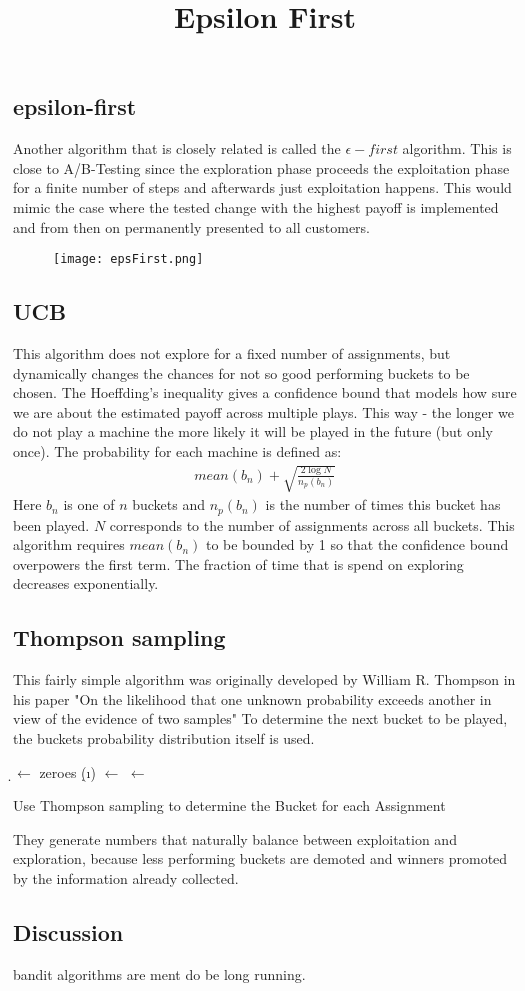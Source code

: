\documentclass[main.tex]{subfiles}
\begin{document}
\subsection{epsilon-first}
Another algorithm that is closely related is called the $\epsilon-first$ algorithm. This is close to A/B-Testing since the exploration phase proceeds the exploitation phase for a finite number of steps and afterwards just exploitation happens. This would mimic the case where the tested change with the highest payoff is implemented and from then on permanently presented to all customers.
\begin{figure}[ht]
\texttt{[image: epsFirst.png]}
\centering
\title{Epsilon First}
\end{figure}

\subsection{UCB}
This algorithm does not explore for a fixed number of assignments, but dynamically changes the chances for not so good performing buckets to be chosen. The Hoeffding's inequality gives a confidence bound that models how sure we are about the estimated payoff across multiple plays. This way - the longer we do not play a machine the more likely it will be played in the future (but only once). The probability for each machine is defined as:
\begin{align*}
mean(b_n) + \sqrt{\frac{2\log{N}}{n_p(b_n)}}
\end{align*}
Here $b_n$ is one of $n$ buckets and $n_p(b_n)$ is the number of times this bucket has been played. $N$ corresponds to the number of assignments across all buckets. This algorithm requires $mean(b_n)$ to be bounded by 1 so that the confidence bound overpowers the first term. The fraction of time that is spend on exploring decreases exponentially.
\

\subsection{Thompson sampling}
This fairly simple algorithm was originally developed by William R. Thompson in his paper "On the likelihood that one unknown probability exceeds another in view of the evidence of two samples" \cite{thompson1933likelihood} To determine the next bucket to be played, the buckets probability distribution itself is used.
\begin{algorithm}
\KwIn{\b}
\KwOut{\na}
\BlankLine
\d $\leftarrow$ zeroes \;
{
\d(\i) $\leftarrow$ \draw{\b{\i}}
}
\na $\leftarrow$ \max{\d} \;

\caption[Thompson Sampling]{Use Thompson sampling to determine the Bucket for each Assignment}
\label{alg:ThompsonSampling}
\end{algorithm}

They generate numbers that naturally balance between exploitation and exploration, because less performing buckets are demoted and winners promoted by the information already collected.

\subsection{Discussion}
bandit algorithms are ment do be long running.
\end{document}
